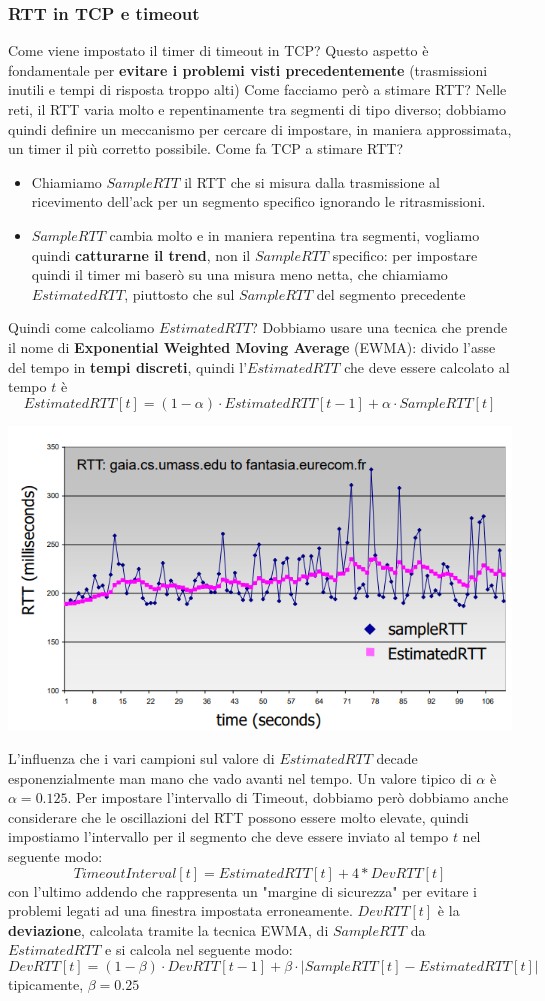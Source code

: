 \documentclass[12pt]{article}
\begin{document}
\subsubsection{RTT in TCP e timeout}
Come viene impostato il timer di timeout in TCP? Questo aspetto è fondamentale per \textbf{evitare i problemi visti precedentemente} (trasmissioni inutili e tempi di risposta troppo alti)
Come facciamo però a stimare RTT? Nelle reti, il RTT varia molto e repentinamente tra segmenti di tipo diverso; dobbiamo quindi definire un meccanismo per cercare di impostare, in maniera approssimata,
un timer il più corretto possibile. Come fa TCP a stimare RTT?
\begin{itemize}
    \item Chiamiamo $SampleRTT$ il RTT che si misura dalla trasmissione al ricevimento dell'ack per un segmento specifico ignorando le ritrasmissioni.
    \item $SampleRTT$ cambia molto e in maniera repentina tra segmenti, vogliamo quindi \textbf{catturarne il trend}, non il $SampleRTT$ specifico: per impostare quindi il timer mi baserò su una misura meno netta, che chiamiamo $EstimatedRTT$, piuttosto che sul $SampleRTT$ del segmento precedente
\end{itemize}
Quindi come calcoliamo $EstimatedRTT$? Dobbiamo usare una tecnica che prende il nome di \textbf{Exponential Weighted Moving Average} (EWMA):
divido l'asse del tempo in \textbf{tempi discreti}, quindi l'$EstimatedRTT$ che deve essere calcolato al tempo $t$ è
$$EstimatedRTT[t] = (1-\alpha)\cdot EstimatedRTT[t-1] + \alpha \cdot SampleRTT[t]$$
\begin{center}
    \includegraphics[width = 0.65\linewidth]{Images/58.png}
\end{center}
L'influenza che i vari campioni sul valore di $EstimatedRTT$ decade esponenzialmente man mano che vado avanti nel tempo.
Un valore tipico di $\alpha$ è $\alpha = 0.125$. Per impostare l'intervallo di Timeout, dobbiamo però dobbiamo anche considerare
che le oscillazioni del RTT possono essere molto elevate, quindi impostiamo l'intervallo per il segmento che deve essere inviato al tempo $t$ nel seguente modo:
$$TimeoutInterval[t] = EstimatedRTT[t] + 4*DevRTT[t]$$
con l'ultimo addendo che rappresenta un "margine di sicurezza" per evitare i problemi legati ad una finestra impostata erroneamente.
$DevRTT[t]$ è la \textbf{deviazione}, calcolata tramite la tecnica EWMA, di $SampleRTT$ da $EstimatedRTT$ e si calcola nel seguente modo:
$$DevRTT[t] = (1-\beta)\cdot DevRTT[t-1] + \beta \cdot |SampleRTT[t] - EstimatedRTT[t]|$$
tipicamente, $\beta = 0.25$
\end{document}
